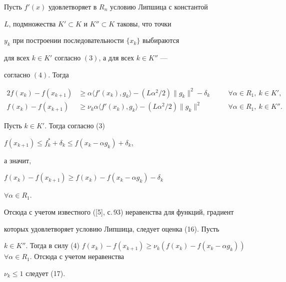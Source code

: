 \begin{lemnonum}


Пусть $f'(x)$ удовлетворяет в $R_n$ условию Липшица с константой


$L$, подмножества $K'\subset K$ и $K''\subset K$ таковы, что точки


$y_k$ при построении последовательности $\{x_k\}$ выбираются


для всех $k\in K'$ согласно $(3)$, а для всех $k\in K''$ ---


согласно $(4)$. Тогда


\begin{alignat}{2}


f(x_k)-f(x_{k+1})&\geq \alpha\langle f'(x_k),g_k \rangle -


(L\alpha^2/2)\|g_k\|^2-\delta_k &\quad &\forall \alpha \in R_1,


\ k\in {K}', \\


f(x_k)-f(x_{k+1})&\geq \nu_k \alpha \langle f'(x_k),g_k \rangle -


(L\alpha^2/2)\|g_k\|^2 &\quad &\forall \alpha \in R_1,


\ k\in {K}''.


\end{alignat}


\end{lemnonum}





\begin{pf} Пусть $k\in K'$. Тогда согласно (3)\;


$f(x_{k+1})\leq f^*_k+\delta_k\leq f(x_k-\alpha g_k)+\delta_k$,


а значит,


$f(x_k)-f(x_{k+1})\geq f(x_k)-f(x_k-\alpha g_k)-\delta_k$


$\forall \alpha \in R_1$.


Отсюда с учетом известного ([5], с.\,93) неравенства для функций, градиент


которых удовлетворяет условию Липшица, следует оценка (16). Пусть


$k\in K''$. Тогда в силу (4)\; $f(x_k)-f(x_{k+1})\geq \nu_k(f(x_k)-


f(x_k-\alpha g_k))$ $\forall \alpha \in R_1$. Отсюда с учетом неравенства


$\nu_k\leq 1$ следует (17).


\end{pf}





